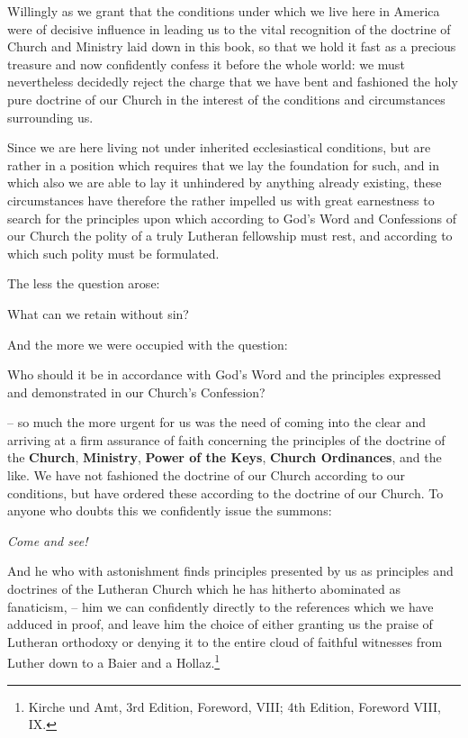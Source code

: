 \begin{fancyquotes}Willingly as we grant that the conditions under which we live here in America were of decisive influence in leading us to the vital recognition of the doctrine of Church and Ministry laid down in this book, so that we hold it fast as a precious treasure and now confidently confess it before the whole world: we must nevertheless decidedly reject the charge that we have bent and fashioned the holy pure doctrine of our Church in the interest of the conditions and circumstances surrounding us.  \par Since we are here living not under inherited ecclesiastical conditions, but are rather in a position which requires that we lay the foundation for such, and in which also we are able to lay it unhindered by anything already existing, these circumstances have therefore the rather impelled us with great earnestness to search for the principles upon which according to God’s Word and Confessions of our Church the polity of a truly Lutheran fellowship must rest, and according to which such polity must be formulated. \par The less the question arose: \begin{displayquote} {\footnotesize What can we retain without sin?}\end{displayquote} And the more we were occupied with the question: \begin{displayquote}{\footnotesize Who should it be in accordance with God’s Word and the principles expressed and demonstrated in our Church’s Confession?}\end{displayquote} -- so much the more urgent for us was the need of coming into the clear and arriving at a firm assurance of faith concerning the principles of the doctrine of the \textbf{Church}, \textbf{Ministry}, \textbf{Power of the Keys}, \textbf{Church Ordinances}, and the like.  We have not fashioned the doctrine of our Church according to our conditions, but have ordered these according to the doctrine of our Church.  To anyone who doubts this we confidently issue the summons: \begin{displayquote}\textit{Come and see!}\end{displayquote}  And he who with astonishment finds principles presented by us as principles and doctrines of the Lutheran Church which he has hitherto abominated as fanaticism, -- him we can confidently directly to the references which we have adduced in proof, and leave him the choice of either granting us the praise of Lutheran orthodoxy or denying it to the entire cloud of faithful witnesses from Luther down to a Baier and a Hollaz.\footnote{Kirche und Amt, 3rd Edition, Foreword, VIII; 4th Edition, Foreword VIII, IX.}\end{fancyquotes}

